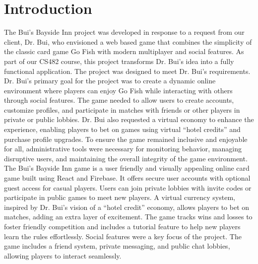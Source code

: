 \clearpage
\section{Introduction}
The Bui’s Bayside Inn project was developed in response to a request from our client, Dr. Bui, who envisioned a web based game that combines the simplicity  of the classic card game Go Fish with modern multiplayer and social features. As part of our CS482 course, this project transforms Dr. Bui’s idea into a fully functional application. The project was designed to meet Dr. Bui’s requirements. Dr. Bui’s primary goal for the project was to create a dynamic online environment where players can enjoy Go Fish while interacting with others through social features. The game needed to allow users to create accounts, customize profiles, and participate in matches with friends or other players in private or public lobbies. Dr. Bui also requested a virtual economy to enhance the experience, enabling players to bet on games using virtual “hotel credits” and purchase profile upgrades. To ensure the game remained inclusive and enjoyable for all, administrative tools were necessary for monitoring behavior, managing disruptive users, and maintaining the overall integrity of the game environment. The Bui’s Bayside Inn game is a user friendly and visually appealing online card game built using React and Firebase. It offers secure user accounts with optional guest access for casual players. Users can join private lobbies with invite codes or participate in public games to meet new players. A virtual currency system, inspired by Dr. Bui’s vision of a “hotel credit” economy, allows players to bet on matches, adding an extra layer of excitement. The game tracks wins and losses to foster friendly competition and includes a tutorial feature to help new players learn the rules effortlessly. Social features were a key focus of the project. The game includes a friend system, private messaging, and public chat lobbies, allowing players to interact seamlessly. 

\pagebreak